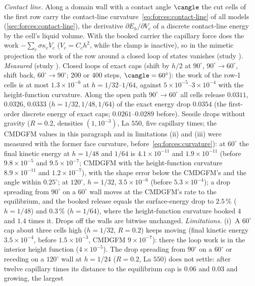 \emph{Contact line.} Along a domain wall with a contact angle $\cangle$ the
cut cells of the first row carry the contact-line
curvature~\cref{eq:forces:contact-line} of all models
(\cref{sec:forces:contact-line}), the derivative $\partial E_h/\partial V_c$ of
a discrete contact-line energy by the cell's liquid volume. With the booked
carrier the capillary force does the work $-\sum_c\sigma\kappa_c\dot V_c$
($V_c=C_ch^2$, while the clamp is inactive), so in the mimetic projection the
work of the row around a closed loop of states vanishes (study
).
\emph{Measured} (study ). Closed loops of exact
caps (shift by $h/2$ at $90^\circ$, $90^\circ\to60^\circ$, shift back,
$60^\circ\to90^\circ$; 200 or 400 steps, $\cangle=60^\circ$): the work of the
row-1 cells is at most $1.3\times10^{-6}$ at $h=1/32$--$1/64$, against
$5\times10^{-5}$--$3\times10^{-4}$ with the height-function curvature. Along the open path
$90^\circ\to60^\circ$ all cells release $0.0311$, $0.0326$, $0.0333$
($h=1/32,1/48,1/64$) of the exact energy drop $0.0354$ (the first-order
discrete energy of exact caps; $0.0261$--$0.0289$ before). Sessile drops
without gravity ($R=0.2$, densities $(1,10^{-3})$, La $550$, five capillary
times; the CMDGFM values in this paragraph and in limitations (ii) and (iii)
were measured with the former face curvature, before~\cref{eq:forces:curvature}):
at $60^\circ$ the final kinetic energy at $h=1/48$ and $1/64$ is
$4.1\times10^{-11}$ and $1.9\times10^{-11}$ (before $9.8\times10^{-5}$ and
$9.5\times10^{-7}$; CMDGFM with the height-function curvature
$8.9\times10^{-11}$ and $1.2\times10^{-7}$), with the
shape error below the CMDGFM's and the angle within $0.25^\circ$; at
$120^\circ$, $h=1/32$, $3.5\times10^{-6}$ (before $5.3\times10^{-4}$); a drop
spreading from $90^\circ$ on a $60^\circ$ wall moves at the CMDGFM's rate to the
equilibrium, and the booked release equals the surface-energy drop to
$2.5\,\%$ ($h=1/48$) and $0.3\,\%$ ($h=1/64$), where the height-function
curvature booked $4$ and $1.4$ times it. Drops off the walls are bitwise
unchanged.
\emph{Limitations.} (i)~A $60^\circ$ cap about three
cells high ($h=1/32$, $R=0.2$) keeps moving (final kinetic energy
$3.5\times10^{-4}$, before $1.5\times10^{-3}$, CMDGFM $9\times10^{-7}$): there the
loop work is in the interior height function ($4\times10^{-5}$). The drop
spreading from $90^\circ$ on a $60^\circ$ or receding on a $120^\circ$ wall at
$h=1/24$ ($R=0.2$, La $550$) does not settle: after twelve capillary times its
distance to the equilibrium cap is $0.06$ and $0.03$ and growing, the largest
